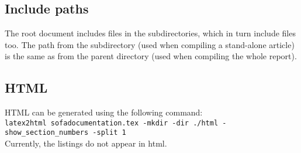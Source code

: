 \documentclass[a4paper,10pt]{report}
\begin{document}
\subsection{Include paths}
The root document includes files in the subdirectories, which in turn include files too. The path from the subdirectory (used when compiling a stand-alone article) is the same as from the parent directory (used when compiling the whole report).

\subsection{HTML}
HTML can be generated using the following command:\\
\texttt{latex2html sofadocumentation.tex -mkdir -dir ./html -show\_section\_numbers -split 1}
\\
Currently, the listings do not appear in html.
\end{document}
